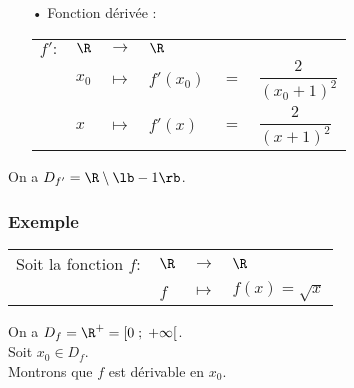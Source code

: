 \begin{itemize}
\item[•] Fonction dérivée : \\

\begin{tabular}{llllll}
$f' :$ & $\R$ & $\longrightarrow$ & $\R$ & & \\
& $x_0$ & $\longmapsto$ & $f'(x_0)$ & $ = $ & $\dfrac{2}{\left(x_0 + 1\right)^2}$ \vspace*{.3cm} \\
& $x$ & $\longmapsto$ & $f'(x)$ & $ = $ & $\dfrac{2}{\left(x + 1\right)^2}$ \\
\end{tabular}
\end{itemize}

\vspace*{.3cm}

On a $D_{f'} = \R \setminus \lb -1 \rb $.

\newpage

\vspace*{-1.1cm}

\subsubsection{Exemple }

\begin{tabular}{llll}
Soit la fonction $f :$ & $\R$ & $\longrightarrow$ & $\R$ \\
& $f$ & $\longmapsto$ & $f(x) = \sqrt{x} $ \\
\end{tabular}

On a $D_f = \R^+ = \left[0 \; ; \; +\infty\right[$. \\

Soit $x_0 \in D_f$. \\

Montrons que $f$ est dérivable en $x_0$. \\

